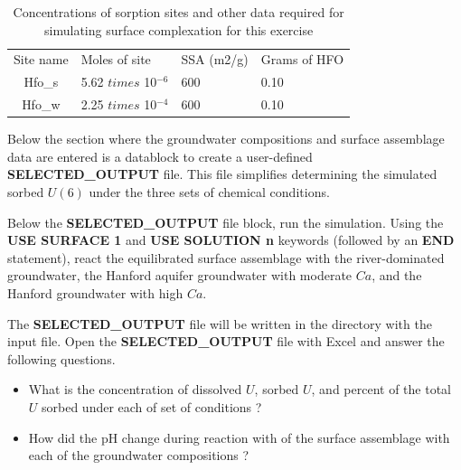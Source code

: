 \begin{table}[h]
\begin{center}
\centering
\caption{Concentrations of sorption sites and other data required for simulating surface complexation for this exercise}
\begin{tabular}{clll}
\toprule
Site name	& Moles of site              	& SSA (m2/g)	& Grams of HFO \\
Hfo\_s	  & 5.62 $times$ 10$^{-6}$	    & 600	        & 0.10 \\
Hfo\_w	  & 2.25 $times$ 10$^{-4}$	    & 600       	& 0.10 \\
\bottomrule
\end{tabular}
\label{tab:hanford2}
\end{center}
\end{table}

Below the section where the groundwater 
compositions and surface assemblage data are entered 
is a datablock to create a user-defined
{\color{red}\textbf{SELECTED\_OUTPUT}} file.  
This file simplifies determining the simulated sorbed $U(6)$ 
under the three sets of chemical conditions.

Below the {\color{red}\textbf{SELECTED\_OUTPUT}} file block, 
run the simulation. Using the {\color{red}\textbf{USE SURFACE 1}} 
and {\color{red}\textbf{USE SOLUTION n}} keywords 
(followed by an {\color{red}\textbf{END}} statement), 
react the equilibrated surface assemblage with the river-dominated groundwater, 
the Hanford aquifer groundwater with moderate $Ca$, 
and the Hanford groundwater with high $Ca$. 

The {\color{red}\textbf{SELECTED\_OUTPUT}} file will be written in the directory with the input file.  
Open the {\color{red}\textbf{SELECTED\_OUTPUT}} file 
with Excel and answer the following questions.

\begin{itemize}
\item What is the concentration of dissolved $U$, sorbed $U$, 
and percent of the total $U$ sorbed under each of set of conditions ?  
\item How did the pH change during reaction with of the surface assemblage with each of the groundwater compositions ?
\end{itemize}
